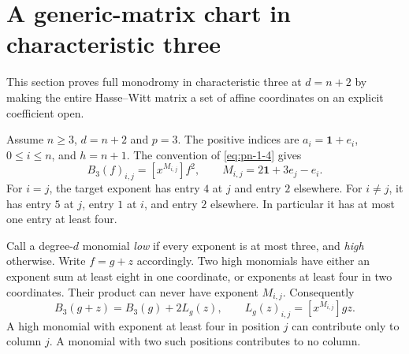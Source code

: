 \section{A generic-matrix chart in characteristic three}\label{sec:three-seed}
This section proves full monodromy in characteristic three at $d=n+2$ by making the entire Hasse--Witt matrix a set of affine coordinates on an explicit coefficient open.

Assume $n\ge3$, $d=n+2$ and $p=3$. The positive indices are $a_i=\mathbf1+e_i$, $0\le i\le n$, and $h=n+1$. The convention of \eqref{eq:pn-1-4} gives
\begin{equation}\label{eq:three-matrix}
B_3(f)_{i,j}=[x^{M_{i,j}}]f^2,
\qquad M_{i,j}=2\mathbf1+3e_j-e_i.
\end{equation}
For $i=j$, the target exponent has entry $4$ at $j$ and entry $2$ elsewhere. For $i\ne j$, it has entry $5$ at $j$, entry $1$ at $i$, and entry $2$ elsewhere. In particular it has at most one entry at least four.

Call a degree-$d$ monomial \emph{low} if every exponent is at most three, and \emph{high} otherwise. Write $f=g+z$ accordingly. Two high monomials have either an exponent sum at least eight in one coordinate, or exponents at least four in two coordinates. Their product can never have exponent $M_{i,j}$. Consequently
\begin{equation}\label{eq:three-linear}
B_3(g+z)=B_3(g)+2L_g(z),
\qquad L_g(z)_{i,j}=[x^{M_{i,j}}]gz.
\end{equation}
A high monomial with exponent at least four in position $j$ can contribute only to column $j$. A monomial with two such positions contributes to no column.

